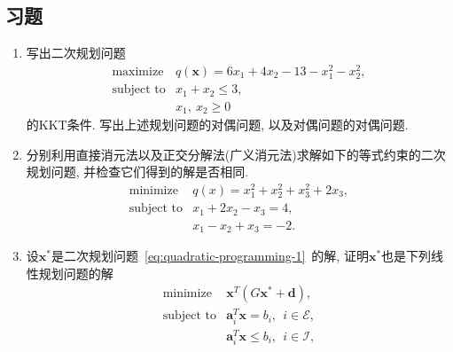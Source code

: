 \documentclass{SBCbookchapter}
\newcommand{\V}[1]{{\bm{#1}}}
\numberwithin{equation}{section}
\begin{document}
\subsection*{习题}

\begin{enumerate}

\item 写出二次规划问题
\begin{equation*}
\begin{array}{cl}
\text{maximize} & q(\V{x}) = 6x_1 + 4x_2 - 13 - x_1^2 - x_2^2, \\
\text{subject to} & x_1 + x_2 \leqslant 3, \\
& x_1, ~ x_2 \geqslant 0
\end{array}
\end{equation*}
的KKT条件. 写出上述规划问题的对偶问题, 以及对偶问题的对偶问题.

\item 分别利用直接消元法以及正交分解法(广义消元法)求解如下的等式约束的二次规划问题, 并检查它们得到的解是否相同.
\begin{equation*}
\begin{array}{cl}
\text{minimize} & q(x) = x_1^2 + x_2^2 + x_3^2 + 2x_3, \\
\text{subject to} & x_1 + 2x_2 - x_3 = 4, \\
& x_1 - x_2 + x_3 = -2.
\end{array}
\end{equation*}

\item 设$\V{x}^*$是二次规划问题~\eqref{eq:quadratic-programming-1}~的解, 证明$\V{x}^*$也是下列线性规划问题的解
\begin{equation*}
\begin{array}{cl}
\text{minimize} & \V{x}^T \left( G \V{x}^* + \V{d} \right), \\
\text{subject to} & \V{a}_i^T \V{x} = b_i, ~~ i \in \mathcal{E}, \\
& \V{a}_i^T \V{x} \leqslant b_i, ~~ i \in \mathcal{I},
\end{array}
\end{equation*}


\end{enumerate}
\end{document}
